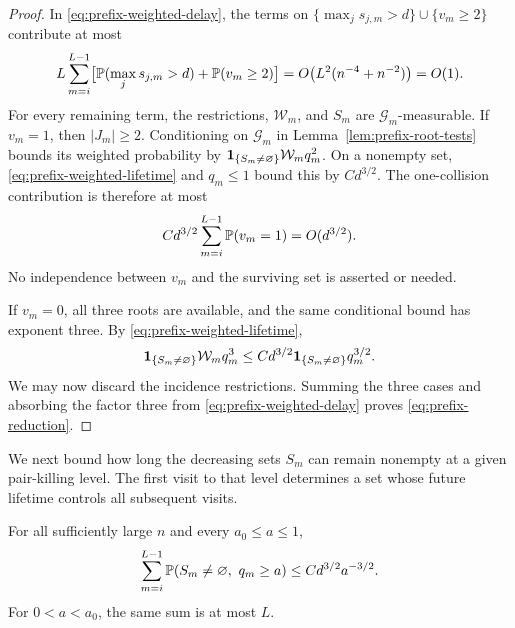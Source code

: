 \begin{proof}
In \eqref{eq:prefix-weighted-delay}, the terms on
\(\{\max_j s_{j,m}>d\}\cup\{v_m\ge2\}\) contribute at most
\[
 L\sum_{m=i}^{L-1}
 \bigl[\mathbb P(\max_j s_{j,m}>d)+\mathbb P(v_m\ge2)\bigr]
 =O\bigl(L^2(n^{-4}+n^{-2})\bigr)=O(1).
\]
For every remaining term, the restrictions, \(\mathcal W_m\), and
\(S_m\) are \(\mathcal G_m\)-measurable.  If \(v_m=1\), then
\(|J_m|\ge2\).  Conditioning on \(\mathcal G_m\) in
Lemma~\ref{lem:prefix-root-tests} bounds its weighted probability by
\(\mathbf 1_{\{S_m\ne\varnothing\}}\mathcal W_mq_m^2\).  On a nonempty set,
\eqref{eq:prefix-weighted-lifetime} and \(q_m\le1\) bound this by
\(Cd^{3/2}\).  The one-collision contribution is therefore at most
\[
 Cd^{3/2}\sum_{m=i}^{L-1}\mathbb P(v_m=1)=O(d^{3/2}).
\]
No independence between \(v_m\) and the surviving set is asserted or
needed.

If \(v_m=0\), all three roots are available, and the same conditional
bound has exponent three.  By \eqref{eq:prefix-weighted-lifetime},
\[
 \mathbf 1_{\{S_m\ne\varnothing\}}\mathcal W_mq_m^3
 \le Cd^{3/2}\mathbf 1_{\{S_m\ne\varnothing\}}q_m^{3/2}.
\]
We may now discard the incidence restrictions.  Summing the three
cases and absorbing the factor three from
\eqref{eq:prefix-weighted-delay} proves \eqref{eq:prefix-reduction}.
\end{proof}

We next bound how long the decreasing sets \(S_m\) can remain nonempty
at a given pair-killing level.  The first visit to that level determines
a set whose future lifetime controls all subsequent visits.

\begin{lemma}\label{lem:prefix-occupation}
For all sufficiently large \(n\) and every \(a_0\le a\le1\),
\begin{equation}\label{eq:prefix-occupation}
 \sum_{m=i}^{L-1}\mathbb P(S_m\ne\varnothing,\ q_m\ge a)
 \le Cd^{3/2}a^{-3/2}.
\end{equation}
For \(0<a<a_0\), the same sum is at most \(L\).
\end{lemma}

